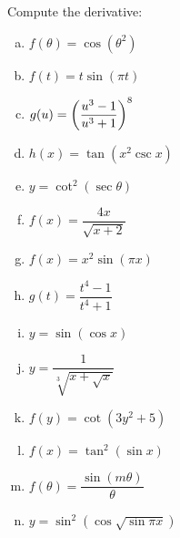 \documentclass[notes]{subfiles}
\begin{document}
			\begin{ex}
				Compute the derivative:
				\begin{enumerate}[(a)]
					\item $f(\theta) = \cos(\theta^2)$
						
					\item $f(t) = t\sin (\pi t)$
						\newpage
						
					\item $g(u) = \left( \dfrac{u^3-1}{u^3+1}\right)^8$
						
					\item $h(x) = \tan(x^2\csc x)$
						
					\item $y = \cot^2(\sec\theta)$
						
					\item $f(x) = \dfrac{4x}{\sqrt{x+2}}$
						\newpage
					
					\item $f(x) = x^2\sin (\pi x)$
						
					\item $g(t) =\dfrac{t^4-1}{t^4+1}$
						
					\item $y = \sin(\cos x)$
						
					\item $y =\dfrac{1}{\sqrt[3]{x + \sqrt{x}}}$
						\newpage
						
					\item $f(y) = \cot (3y^2 + 5)$
						
					\item $f(x) = \tan^2(\sin x)$
						
					\item $f(\theta) = \dfrac{\sin (m\theta)}{\theta}$
						
					\item $y =\sin^2(\cos\sqrt{\sin \pi x})$
				\end{enumerate}
			\end{ex}
	
\clearpage
\end{document}
